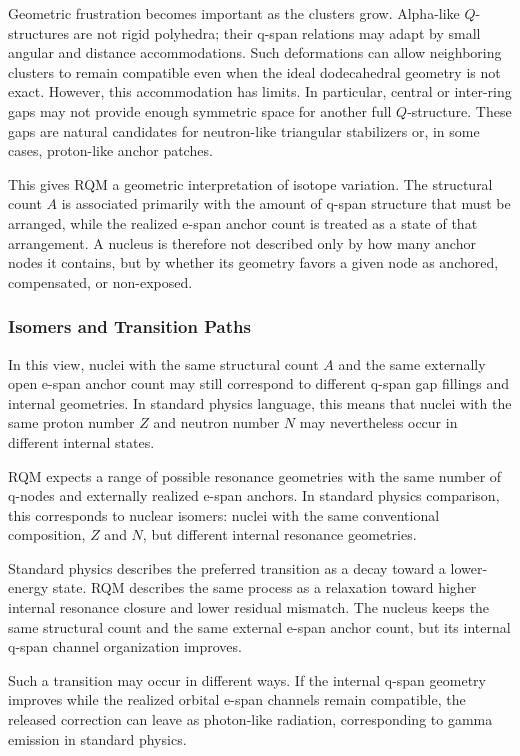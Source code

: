 \documentclass[11pt,a4paper]{article}
\begin{document}
Geometric frustration becomes important as the clusters grow. Alpha-like \(Q\)-structures are not rigid polyhedra; their q-span relations may adapt by small angular and distance accommodations. Such deformations can allow neighboring clusters to remain compatible even when the ideal dodecahedral geometry is not exact. However, this accommodation has limits. In particular, central or inter-ring gaps may not provide enough symmetric space for another full \(Q\)-structure. These gaps are natural candidates for neutron-like triangular stabilizers or, in some cases, proton-like anchor patches.

This gives RQM a geometric interpretation of isotope variation. The structural count \(A\) is associated primarily with the amount of q-span structure that must be arranged, while the realized e-span anchor count is treated as a state of that arrangement. A nucleus is therefore not described only by how many anchor nodes it contains, but by whether its geometry favors a given node as anchored, compensated, or non-exposed.


\subsubsection{Isomers and Transition Paths}

In this view, nuclei with the same structural count \(A\) and the same externally open e-span anchor count may still correspond to different q-span gap fillings and internal geometries. In standard physics language, this means that nuclei with the same proton number \(Z\) and neutron number \(N\) may nevertheless occur in different internal states.

RQM expects a range of possible resonance geometries with the same number of q-nodes and externally realized e-span anchors. In standard physics comparison, this corresponds to nuclear isomers: nuclei with the same conventional composition, \(Z\) and \(N\), but different internal resonance geometries.

Standard physics describes the preferred transition as a decay toward a lower-energy state. RQM describes the same process as a relaxation toward higher internal resonance closure and lower residual mismatch. The nucleus keeps the same structural count and the same external e-span anchor count, but its internal q-span channel organization improves.

Such a transition may occur in different ways. If the internal q-span geometry improves while the realized orbital e-span channels remain compatible, the released correction can leave as photon-like radiation, corresponding to gamma emission in standard physics.
\end{document}
